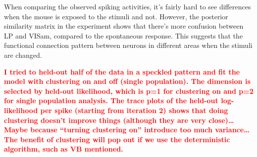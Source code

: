 \documentclass{article}
\begin{document}
	When comparing the observed spiking activities, it's fairly hard to see differences when the mouse is exposed to the stimuli and not. However, the posterior similarity matrix in the experiment shows that there's more confusion between LP and VISam, compared to the spontaneous response. This suggests that the functional connection pattern between neurons in different areas when the stimuli are changed.
	
	\textcolor{red}{\textbf{I tried to held-out half of the data in a speckled pattern and fit the model with clustering on and off (single population). The dimension is selected by held-out likelihood, which is p=1 for clustering on and p=2 for single population analysis. The trace plots of the held-out log-likelihood per spike (starting from iteration 2) shows that doing clustering doesn’t improve things (although they are very close)… Maybe because “turning clustering on” introduce too much variance… The benefit of clustering will pop out if we use the deterministic algorithm, such as VB mentioned.}}
	
\end{document}
